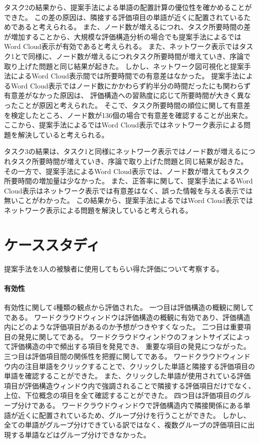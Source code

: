 \documentclass[syuuron]{kuee}
\begin{document}
	タスク2の結果から、提案手法による単語の配置計算の優位性を確かめることができた。
	この差の原因は、隣接する評価項目の単語が近くに配置されているためであると考えられる。
	また、ノード数が増えるにつれ、タスク所要時間の差が増加することから、大規模な評価構造分析の場合でも提案手法によるではWord Cloud表示が有効であると考えられる。
	また、ネットワーク表示ではタスク1とで同様に、ノード数が増えるにつれタスク所要時間が増えていき、序論で取り上げた問題と同じ結果が起きた。
	しかし、ネットワーク図可視化と提案手法によるWord Cloud表示間では所要時間での有意差はなかった。
	提案手法によるWord Cloud表示ではノード数にかかわらず約半分の時間だったにも関わらず有意差がなかった原因は、
	評価構造への習熟度に応じて所要時間が大きく異なったことが原因と考えられた。
	そこで、タスク所要時間の順位に関して有意差を検定したところ、ノード数が136個の場合で有意差を確認することが出来た。
	ここから、提案手法によるではWord Cloud表示ではネットワーク表示による問題を解決していると考えられる。
	
	タスク3の結果は、タスク1と同様にネットワーク表示ではノード数が増えるにつれタスク所要時間が増えていき、序論で取り上げた問題と同じ結果が起きた。
	その一方で、提案手法によるWord Cloud表示では、ノード数が増えてもタスク所要時間の増加量は少なかった。
	また、正答率に関して、提案手法によるWord Cloud表示はネットワーク表示では有意差はなく、誤った情報を与える表示では無いことがわかった。
	この結果から、提案手法によるではWord Cloud表示ではネットワーク表示による問題を解決していると考えられる。
	
	\section{ケーススタディ}%
	提案手法を3人の被験者に使用してもらい得た評価について考察する。
		\paragraph{有効性}
		有効性に関して4種類の観点から評価された。
		一つ目は評価構造の概観に関してである。
		ワードクラウドウィンドウは評価構造の概観に有効であり、評価構造内にどのような評価項目があるのか予想がつきやすくなった。
		二つ目は重要項目の発見に関してである。
		ワードクラウドウィンドウのフォントサイズによって評価構造の中で頻出する項目を発見でき、
		重要な項目の発見につながった。
		三つ目は評価項目間の関係性を把握に関してである。
		ワードクラウドウィンドウ内の注目単語をクリックすることで、クリックした単語と隣接する評価項目の単語を確認することができた。
		また、クリックした単語が使用されている評価項目が評価構造ウィンドウ内で強調されることで隣接する評価項目だけでなく、
		上位、下位概念の項目を全て確認することができた。
		四つ目は評価項目のグループ分けである。
		ワードクラウドウィンドウで評価構造内で隣接関係にある単語が近くに配置されているため、グループ分けを行うことができた。
		しかし、全ての単語がグループ分けできている訳ではなく、複数グループの評価項目に出現する単語などはグループ分けできなかった。
		
\end{document}
